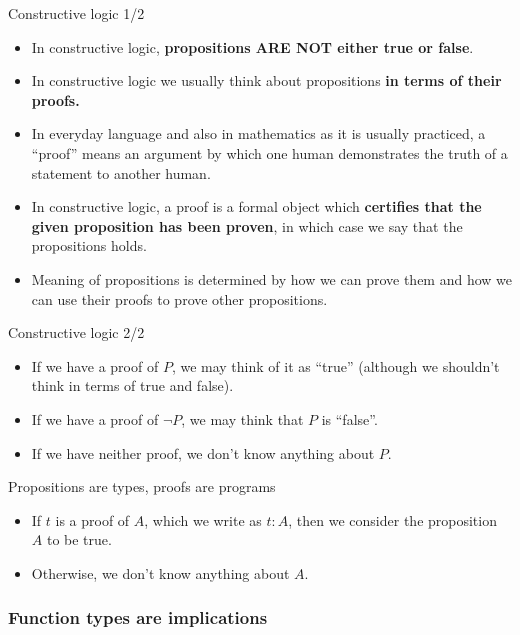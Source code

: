 \documentclass{beamer}
\begin{document}
\begin{frame}{Constructive logic 1/2}
\begin{itemize}
	\item In constructive logic, \textbf{propositions ARE NOT either true or false}.
	\item In constructive logic we usually think about propositions \textbf{in terms of their proofs.}
	\item In everyday language and also in mathematics as it is usually practiced, a ``proof'' means an argument by which one human demonstrates the truth of a statement to another human.
	\item In constructive logic, a proof is a formal object which \textbf{certifies that the given proposition has been proven}, in which case we say that the propositions holds.
	\item Meaning of propositions is determined by how we can prove them and how we can use their proofs to prove other propositions.
\end{itemize}
\end{frame}

\begin{frame}{Constructive logic 2/2}
\begin{itemize}
	\item If we have a proof of $P$, we may think of it as ``true'' (although we shouldn't think in terms of true and false).
	\item If we have a proof of $\neg P$, we may think that $P$ is ``false''.
	\item If we have neither proof, we don't know anything about $P$.
\end{itemize}
\end{frame}

\begin{frame}{Propositions are types, proofs are programs}
\begin{itemize}
	\item If $t$ is a proof of $A$, which we write as $t : A$, then we consider the proposition $A$ to be true.
	\item Otherwise, we don't know anything about $A$.
\end{itemize}
\end{frame}


\subsubsection{Function types are implications}
\end{document}
